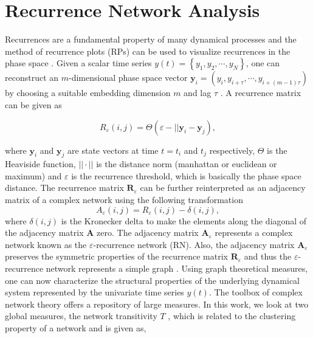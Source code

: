 \documentclass[letterpaper, 9pt, conference]{ieeeconf}
\begin{document}
\section{Recurrence Network Analysis}

Recurrences are a fundamental property of many dynamical processes and the method of recurrence plots (RPs) can be used to visualize recurrences in the phase space \cite{marwan2007recurrence}. Given a scalar time series $y(t) = \left\lbrace y_1,y_2,\cdots,y_N\right\rbrace $, one can reconstruct an $m$-dimensional phase space vector $\mathbf{y}_i = \left(y_i,y_{i+\tau},\cdots,y_{i+(m-1)\tau} \right) $ by choosing a suitable embedding dimension $m$ and lag $\tau$ \cite{kantz2004nonlinear}. A recurrence matrix can be given as

\begin{equation}
R_\varepsilon(i,j) = \Theta(\varepsilon - ||\mathbf{y}_i - \mathbf{y}_j),
\label{eq_1}
\end{equation}

where $\mathbf{y}_i$ and $\mathbf{y}_j$ are state vectors at time $t=t_i$ and $t_j$ respectively, $\Theta$ is the Heaviside function, $||\cdot||$ is the distance norm (manhattan or euclidean or maximum) and $\varepsilon$ is the recurrence threshold, which is basically the phase space distance. The recurrence matrix $\mathbf{R}_\varepsilon$ can be further reinterpreted as an adjacency matrix of a complex network using the following transformation \cite{donner2010recurrence,marwan2009complex}
\begin{equation}
A_\varepsilon(i,j) = R_\varepsilon(i,j) - \delta(i,j),
\label{eq_2}
\end{equation}
where $\delta(i,j)$ is the Kronecker delta to make the elements along the diagonal of the adjacency matrix $\mathbf{A}$ zero. The adjacency matrix $\mathbf{A}_\varepsilon$ represents a complex network known as the $\varepsilon$-recurrence network (RN). Also, the adjacency matrix $\mathbf{A}_\varepsilon$ preserves the symmetric properties of the recurrence matrix $\mathbf{R}_\varepsilon$ and thus the $\varepsilon$-recurrence network represents a simple graph \cite{donner2015complex}. Using graph theoretical measures, one can now characterize the structural properties of the underlying dynamical system represented by the univariate time series $y(t)$. The toolbox of complex network theory offers a repository of large measures. In this work, we look at two global measures, the network transitivity $T$ \cite{boccaletti2006complex}, which is related to the clustering property of a network \cite{barrat2000properties} and is given as,
 
\end{document}
